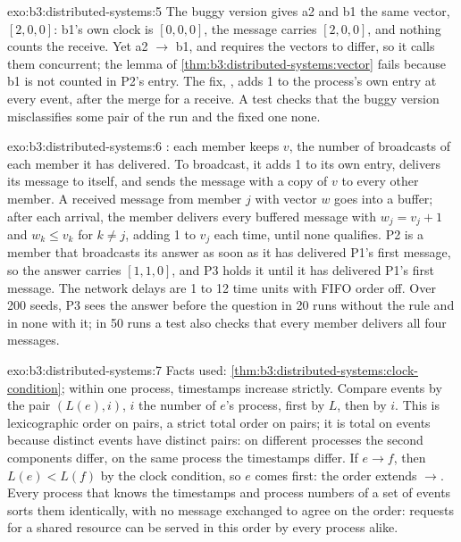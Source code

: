 \begin{solution}{exo:b3:distributed-systems:5}
The buggy version gives a2 and b1 the same vector, $[2, 0, 0]$: b1's own clock is $[0, 0, 0]$, the message carries $[2, 0, 0]$, and nothing counts the receive. Yet a2 $\to$ b1, and  requires the vectors to differ, so it calls them concurrent; the lemma of \cref{thm:b3:distributed-systems:vector} fails because b1 is not counted in P2's entry. The fix, , adds 1 to the process's own entry at every event, after the merge for a receive. A test checks that the buggy version misclassifies some pair of the run and the fixed one none.
\end{solution}

\begin{solution}{exo:b3:distributed-systems:6}
: each member keeps $v$, the number of broadcasts of each member it has delivered. To broadcast, it adds 1 to its own entry, delivers its message to itself, and sends the message with a copy of $v$ to every other member. A received message from member $j$ with vector $w$ goes into a buffer; after each arrival, the member delivers every buffered message with $w_j = v_j + 1$ and $w_k \le v_k$ for $k \ne j$, adding 1 to $v_j$ each time, until none qualifies. P2 is a member that broadcasts its answer as soon as it has delivered P1's first message, so the answer carries $[1, 1, 0]$, and P3 holds it until it has delivered P1's first message. The network delays are 1 to 12 time units with FIFO order off. Over 200 seeds, P3 sees the answer before the question in 20 runs without the rule and in none with it; in 50 runs a test also checks that every member delivers all four messages.
\end{solution}

\begin{solution}{exo:b3:distributed-systems:7}
Facts used: \cref{thm:b3:distributed-systems:clock-condition}; within one process, timestamps increase strictly. Compare events by the pair $(L(e), i)$, $i$ the number of $e$'s process, first by $L$, then by $i$. This is lexicographic order on pairs, a strict total order on pairs; it is total on events because distinct events have distinct pairs: on different processes the second components differ, on the same process the timestamps differ. If $e \to f$, then $L(e) < L(f)$ by the clock condition, so $e$ comes first: the order extends $\to$. Every process that knows the timestamps and process numbers of a set of events sorts them identically, with no message exchanged to agree on the order: requests for a shared resource can be served in this order by every process alike.
\end{solution}

